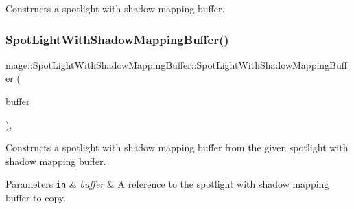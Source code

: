 Constructs a spotlight with shadow mapping buffer. \hypertarget{structmage_1_1_spot_light_with_shadow_mapping_buffer_a5618fa00a4496fd0a9bdef88ccccec5c}{}\label{structmage_1_1_spot_light_with_shadow_mapping_buffer_a5618fa00a4496fd0a9bdef88ccccec5c} 
\subsubsection{\texorpdfstring{Spot\+Light\+With\+Shadow\+Mapping\+Buffer()}{SpotLightWithShadowMappingBuffer()}\hspace{0.1cm}{\footnotesize\ttfamily [2/3]}}
{\footnotesize\ttfamily mage\+::\+Spot\+Light\+With\+Shadow\+Mapping\+Buffer\+::\+Spot\+Light\+With\+Shadow\+Mapping\+Buffer (\begin{DoxyParamCaption}\item[{const \hyperlink{structmage_1_1_spot_light_with_shadow_mapping_buffer}{Spot\+Light\+With\+Shadow\+Mapping\+Buffer} \&}]{buffer }\end{DoxyParamCaption})\hspace{0.3cm}{\ttfamily [default]}, {\ttfamily [noexcept]}}

Constructs a spotlight with shadow mapping buffer from the given spotlight with shadow mapping buffer.


\begin{DoxyParams}[1]{Parameters}
\mbox{\tt in}  & {\em buffer} & A reference to the spotlight with shadow mapping buffer to copy. \\
\hline
\end{DoxyParams}
\hypertarget{structmage_1_1_spot_light_with_shadow_mapping_buffer_aa9afdb5259f897a7e9ac9fc513ef5fc1}{}\label{structmage_1_1_spot_light_with_shadow_mapping_buffer_aa9afdb5259f897a7e9ac9fc513ef5fc1} 
